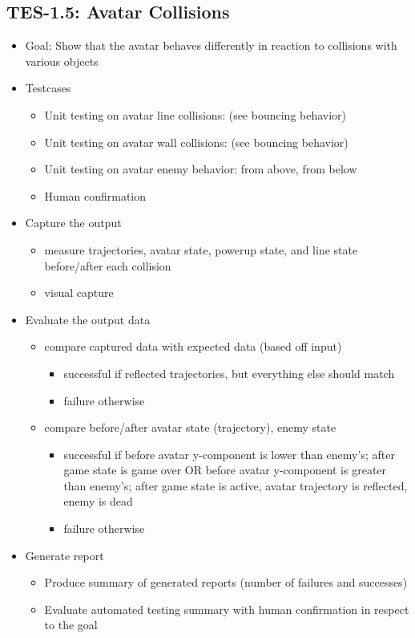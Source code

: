 \subsection{TES-1.5: Avatar Collisions}
\begin{itemize}
\item Goal: Show that the avatar behaves differently in reaction to collisions with various objects

\item Testcases
\begin{itemize}
\item Unit testing on avatar line collisions: (see bouncing behavior)
\item Unit testing on avatar wall collisions: (see bouncing behavior)
\item Unit testing on avatar enemy behavior: from above, from below
\item Human confirmation
\end{itemize}

\item Capture the output
\begin{itemize}
\item measure trajectories, avatar state, powerup state, and line state before/after each collision
\item visual capture
\end{itemize}

\item Evaluate the output data
\begin{itemize}
\item compare captured data with expected data (based off input)
\begin{itemize}
\item successful if reflected trajectories, but everything else should match
\item failure otherwise
\end{itemize}
\item compare before/after avatar state (trajectory), enemy state
\begin{itemize}
\item successful if before avatar y-component is lower than enemy's; after game state is game over OR before avatar y-component is greater than enemy's; after game state is active, avatar trajectory is reflected, enemy is dead
\item failure otherwise
\end{itemize}
\end{itemize}

\item Generate report
\begin{itemize}
\item Produce summary of generated reports (number of failures and successes)
\item Evaluate automated testing summary with human confirmation in respect to the goal
\end{itemize}
\end{itemize}



